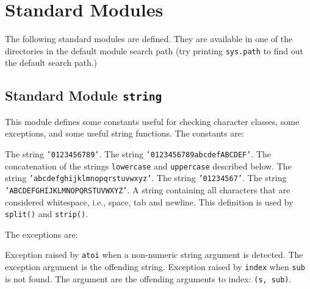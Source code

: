 \section{Standard Modules}

The following standard modules are defined.
They are available in one of the directories in the default module
search path (try printing
{\tt sys.path}
to find out the default search path.)

\subsection{Standard Module {\tt string}}

This module defines some constants useful for checking character
classes, some exceptions, and some useful string functions.
The constants are:
\begin{description}
The string
{\tt '0123456789'}.
The string
{\tt '0123456789abcdefABCDEF'}.
The concatenation of the strings
{\tt lowercase}
and
{\tt uppercase}
described below.
The string
{\tt 'abcdefghijklmnopqrstuvwxyz'}.
The string
{\tt '01234567'}.
The string
{\tt 'ABCDEFGHIJKLMNOPQRSTUVWXYZ'}.
A string containing all characters that are considered whitespace,
i.e.,
space, tab and newline.
This definition is used by
{\tt split()}
and
{\tt strip()}.
\end{description}

The exceptions are:
\begin{description}
Exception raised by
{\tt atoi}
when a non-numeric string argument is detected.
The exception argument is the offending string.
Exception raised by
{\tt index}
when
{\tt sub}
is not found.
The argument are the offending arguments to index: {\tt (s, sub)}.
\end{description}

